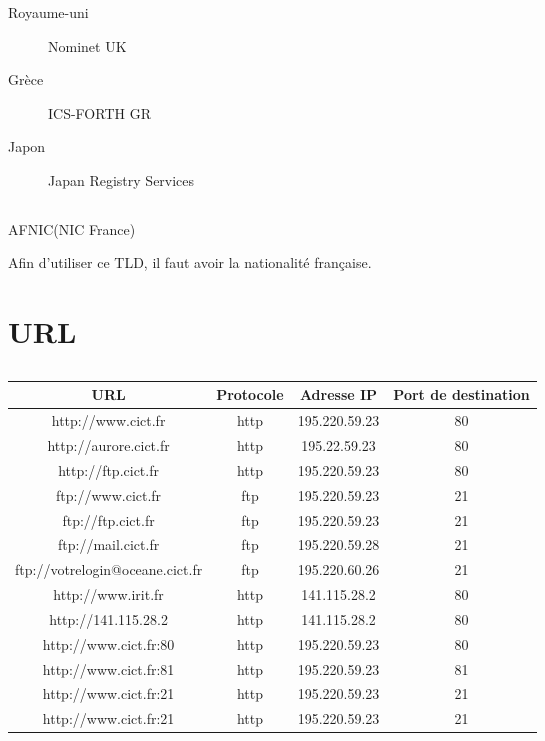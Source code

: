 \documentclass[a4paper, 11pt]{article}
\begin{document}
	\subsubsection{}
\begin{description}
	\item[Royaume-uni] Nominet UK
	\item[Grèce]ICS-FORTH GR
	\item[Japon] Japan Registry Services 
\end{description}
\subsection{}
AFNIC(NIC France)

Afin d'utiliser ce TLD, il faut avoir la nationalité française.
	\section{URL}
	\subsection{}
	\subsection{}
	\begin{tabular}{c|c|c|c|}
		URL & Protocole & Adresse IP & Port de destination\\
		\hline
		http://www.cict.fr & http & 195.220.59.23 & 80\\
		\hline
		http://aurore.cict.fr & http & 195.22.59.23 & 80\\
		\hline
		http://ftp.cict.fr & http & 195.220.59.23& 80\\
		\hline
		ftp://www.cict.fr & ftp & 195.220.59.23& 21\\
		\hline
		ftp://ftp.cict.fr & ftp & 195.220.59.23 & 21\\
		\hline
		ftp://mail.cict.fr & ftp & 195.220.59.28 & 21\\
		\hline
		ftp://votrelogin@oceane.cict.fr & ftp & 195.220.60.26 & 21\\
		\hline
		http://www.irit.fr & http & 141.115.28.2 & 80\\
		\hline
		http://141.115.28.2 & http & 141.115.28.2 & 80\\
		\hline
		http://www.cict.fr:80 & http & 195.220.59.23 & 80\\
		\hline
		http://www.cict.fr:81 & http & 195.220.59.23 & 81\\
		\hline
		http://www.cict.fr:21 & http & 195.220.59.23 & 21\\
		\hline
		http://www.cict.fr:21 & http & 195.220.59.23 & 21\\
		\hline
	\end{tabular}
\end{document}
